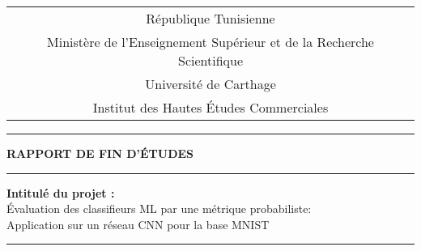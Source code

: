
\begin{center}
\thispagestyle{empty}

\begin{tabular}{c}
\small
République Tunisienne\\
Ministère de l’Enseignement Supérieur et de la Recherche Scientifique \\
\vspace{0.2cm}
\small
Université de Carthage \\
\vspace{0.3cm}
\small
Institut des Hautes Études Commerciales

\end{tabular}
\vspace{0.5cm}
\hrule
\vspace{0.5cm}

\vspace{0.8cm}

{\Large{\textbf{RAPPORT DE FIN D'\'ETUDES }}}
\vspace{-0.5cm}
\vspace{-0.5cm}
\vspace{1cm}
\hrule height 1pt
{\large{\textbf{Intitulé du projet : }\\Évaluation des classifieurs ML par une métrique probabiliste: \\Application sur un réseau CNN pour la base MNIST
}} %
\vspace{0.7cm}
\\ \par
\hrule height 3pt
\par
\vspace{1cm}
\vspace{-0.5cm}

\vspace{0.2cm}

\vspace{-0.8cm}

\begin{table} [H]
\center
\renewcommand{\footnoterule}{}
\renewcommand{\arraystretch}{1}
\setlength\tabcolsep{5pt}
\begin{tabular}{ll}


  

\end{tabular}
\end{table}
\end{center}
